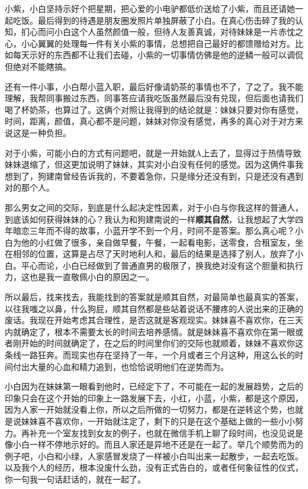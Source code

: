 \documentclass{article}
\begin{document}
小紫，小白坚持示好个把星期，把心爱的小电驴都低价送给了小紫，而且还请她一起吃饭。最后得到的待遇是朋友圈发照片单独屏蔽了小白。在真心伤击碎了我的认知，扪心而问小白这个人虽然颜值一般，但待人友善真诚，对待妹妹是一片赤忱之心，小心翼翼的处理每一件有关小紫的事情，总想把自己最好的都馈赠给对方。比如每天示好的东西都不让我们去碰，小紫的一切事情仿佛是他的逆鳞一般可以调侃但绝对不能瞎搞。

还有一件小事，小白帮小蓝入职，最后好像请奶茶的事情也不了，了之了。我不能理解，我帮同事搬过东西，同事答应请我吃饭虽然最后没有兑现，但后面也请我们喝了杯奶茶，也算过了。这俩个对照让我得到的结论就是：妹妹只要对你有感觉，时间，距离，颜值，真心都不是问题，妹妹对你没有感觉，再多的真心对于对方来说这是一种负担。

对于小紫，可能小白的方式有问题吧，就是一开始就A上去了，显得过于热情导致妹妹退缩了，但这更加说明了妹妹，其实对小白没有任何的感觉。因为这俩件事我想到了，狗建南曾经告诉我的，不要着急你，只是缘分还没有到，只是还没有遇到对的那个人。

那么男女之间的交际，到底是什么起决定性因素，对于小白与你我这样的普通人，到底该如何获得妹妹的心？我认为和狗建南说的一样\textbf{顺其自然}，让我想起了大学四年暗恋三年而不得的故事，小蓝开学不到一个月，时间不是答案。那么真心呢？小白为他的小红做了很多，亲自做早餐，午餐，一起看电影，送零食，合租室友，坐在相邻的位置，这算是占尽了天时地利人和，最后的结果是选择了别人，放弃了小白。平心而论，小白已经做到了普通直男的极限了，换我绝对没有这个胆量和执行力，这也是我一直敬佩小白的原因之一。

所以最后，找来找去，我能找到的答案就是顺其自然，对最简单也最真实的答案，以往我嗤之以鼻，什么狗屁，顺其自然都是些站着说话不腰疼的人说出来的正确的废话。我现在开始考虑其合理性，是否这就是客观现实。妹妹喜不喜欢你，在三天内就确定了，根本不需要太长的时间去培养感情。就是妹妹喜不喜欢你在第一眼或者刚开始的时间就确定了，在之后的时间里你们的交际也就顺着，妹妹不喜欢你这条线一路狂奔。而现实也存在坚持了一年，一个月或者三个月这种，用这么长的时间付出大量的心血和精力追到，也恰恰说明他们在逆势而为。

小白因为在妹妹第一眼看到他时，已经定下了，不可能在一起的发展趋势，之后的印象只会在这个开始的印象上一路发展下去，小红，小蓝，小紫，都是这个原因，因为人家一开始就没看上你，所以之后所做的一切努力，都是在逆转这个势，也就是说妹妹喜不喜欢你，一开始就注定了，剩下的只是在这个基础上做的一些小小努力。再补充一个室友找到女友的例子，也就在微信手机上聊了段时间，也没见说是像小白一样不停地示好的。而且人家还是异地不还是在一起了。举几个顺势而为的例子吧，小白和小绿，人家感冒发烧了一样被小白叫出来一起散步，一起去吃饭。以及我个人的经历，根本没废什么劲，没有正式告白的，或者任何象征性的仪式，你一句我一句话赶话的，就在一起了。
\end{document}
